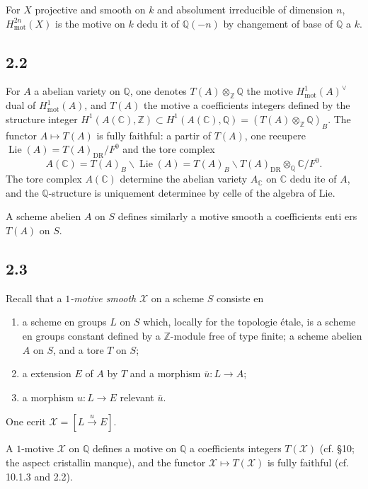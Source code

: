 \documentclass[12pt,a4paper]{article}
\theoremstyle{plain}
\theoremstyle{definition}
\theoremstyle{remark}
\DeclareMathOperator{\Lie}{Lie}
\newcommand{\mot}{\mathrm{mot}}
\providecommand{\mot}{\mathrm{mot}}
\providecommand{\DR}{\mathrm{DR}}
\providecommand{\Lie}{\operatorname{Lie}}
\begin{document}
For $X$ projective and smooth on $k$ and absolument irreducible of dimension $n$,
$H^{2n}_\mot(X)$ is the motive on $k$ dedu it of $\mathbb{Q}(-n)$ by changement of
base of $\mathbb{Q}$ a $k$.

\subsection*{2.2}

For $A$ a abelian variety on $\mathbb{Q}$, one denotes $T(A) \otimes_{\mathbb{Z}}
\mathbb{Q}$ the motive $H^1_\mot(A)^\vee$ dual of $H^1_\mot(A)$, and $T(A)$ the motive a
coefficients integers defined by the structure integer $H^1(A(\mathbb{C}), \mathbb{Z}) \subset
H^1(A(\mathbb{C}), \mathbb{Q}) = (T(A) \otimes_{\mathbb{Z}} \mathbb{Q})_B$. The functor
$A \mapsto T(A)$ is fully faithful: a partir of $T(A)$, one recupere
$\Lie(A) = T(A)_{\DR}/F^0$ and the tore complex
\[
A(\mathbb{C}) = T(A)_B \backslash \Lie(A) = T(A)_B \backslash T(A)_{\DR}
\otimes_{\mathbb{Q}} \mathbb{C}/F^0.
\]
The tore complex $A(\mathbb{C})$ determine the abelian variety $A_\mathbb{C}$
on $\mathbb{C}$ dedu ite of $A$, and the $\mathbb{Q}$-structure is uniquement determinee
by celle of the algebra of Lie.

A scheme abelien $A$ on $S$ defines similarly a motive smooth a coefficients
enti ers $T(A)$ on $S$.

\subsection*{2.3}

Recall that a \emph{$1$-motive smooth} $\mathcal{X}$ on a scheme $S$ consiste en
\begin{enumerate}[label=(\alph*)]
\item a scheme en groups $L$ on $S$ which, locally for the topologie étale, is
a scheme en groups constant defined by a $\mathbb{Z}$-module free of type finite; a
scheme abelien $A$ on $S$, and a tore $T$ on $S$;
\item a extension $E$ of $A$ by $T$ and a morphism $\bar{u}: L \to A$;
\item a morphism $u: L \to E$ relevant $\bar{u}$.
\end{enumerate}
One ecrit $\mathcal{X} = [L \xrightarrow{u} E]$.

A $1$-motive $\mathcal{X}$ on $\mathbb{Q}$ defines a motive on $\mathbb{Q}$ a
coefficients integers $T(\mathcal{X})$ (cf. \cite{D3} \S10; the aspect cristallin manque), and the
functor $\mathcal{X} \mapsto T(\mathcal{X})$ is fully faithful (cf. \cite{D3} 10.1.3 and
2.2).
\end{document}
